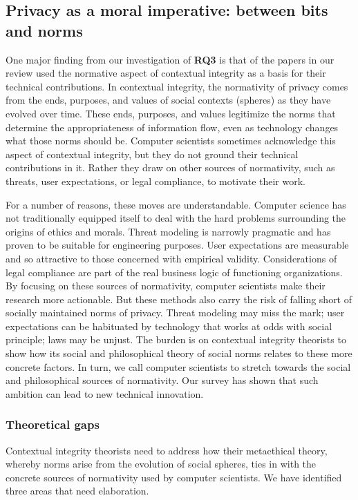 \documentclass[../thesis.tex]{subfiles}
\begin{document}
\subsection{Privacy as a moral imperative: between bits and norms}
\label{CI5.3}

One major finding from our investigation of
\textbf{RQ3} is that of the papers in
our review used the normative aspect of contextual integrity as a basis
for their technical contributions. In contextual integrity, the
normativity of privacy comes from the ends, purposes, and values of
social contexts (spheres) as they have evolved over time. These ends,
purposes, and values legitimize the norms that determine the
appropriateness of information flow, even as technology changes what
those norms should be. Computer scientists sometimes acknowledge this
aspect of contextual integrity, but they do not ground their technical
contributions in it. Rather they draw on other sources of normativity,
such as threats, user expectations, or legal compliance, to motivate
their work.

For a number of reasons, these moves are understandable. Computer
science has not traditionally equipped itself to deal with the hard
problems surrounding the origins of ethics and morals. Threat modeling
is narrowly pragmatic and has proven to be suitable for engineering
purposes. User expectations are measurable and so attractive to those
concerned with empirical validity. Considerations of legal compliance
are part of the real business logic of functioning organizations. By
focusing on these sources of normativity, computer scientists make
their research more actionable. But these methods also carry the risk
of falling short of socially maintained norms of privacy. Threat
modeling may miss the mark; user expectations can be habituated by
technology that works at odds with social principle; laws may be
unjust. The burden is on contextual integrity theorists to show how its
social and philosophical theory of social norms relates to these more
concrete factors. In turn, we call computer scientists to stretch
towards the social and philosophical sources of normativity. Our survey
has shown that such ambition can lead to new technical innovation.

\subsubsection{Theoretical gaps}
\label{CI5.3.1}

Contextual integrity theorists need to address how their metaethical
theory, whereby norms arise from the evolution of social spheres, ties
in with the concrete sources of normativity used by computer
scientists. We have identified three areas that need elaboration.
\end{document}
